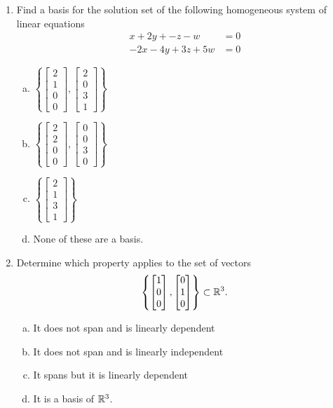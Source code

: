 \documentclass{article}
\begin{document}
\begin{enumerate}[1)]
\item Find a basis for the solution set of the following homogeneous system of linear equations
\begin{align*}
x+2y+-z-w &= 0 \\
-2x-4y+3z+5w &= 0
\end{align*}
\begin{multicols}{4}
\begin{enumerate}[(a)]
\item $\left\{ \begin{bmatrix} 2 \\ 1 \\ 0 \\ 0 \end{bmatrix}, \begin{bmatrix} 2 \\ 0 \\ 3 \\ 1 \end{bmatrix} \right\}$
\item $\left\{ \begin{bmatrix} 2 \\ 2 \\ 0 \\ 0 \end{bmatrix}, \begin{bmatrix} 0 \\ 0 \\ 3 \\ 0 \end{bmatrix} \right\}$
\item $\left\{ \begin{bmatrix} 2 \\ 1 \\ 3 \\ 1 \end{bmatrix} \right\}$
\item None of these are a basis.
\end{enumerate}
\end{multicols}


\item Determine which property applies to the set of vectors $$\left\{ \begin{bmatrix}  1 \\ 0 \\ 0 \end{bmatrix}, \begin{bmatrix} 0 \\ 1 \\ 0 \end{bmatrix} \right\} \subset \mathbb{R}^3.$$
\begin{enumerate}[(a)]
\item It does not span and is linearly dependent
\item It does not span and is linearly independent
\item It spans but it is linearly dependent
\item It is a basis of $\mathbb{R}^3$.
\end{enumerate}


\end{enumerate}
\end{document}
